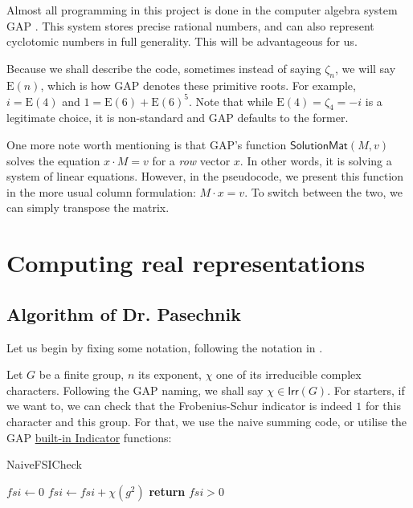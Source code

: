 \documentclass[11pt]{article}
\begin{document}
Almost all programming in this project is done in the computer algebra system GAP
\cite{GAP4}. This system stores precise rational numbers, and can also represent
cyclotomic numbers in full generality. This will be advantageous for us.

Because we shall describe the code, sometimes instead of saying $\zeta_n$, we
will say $\text{E}(n)$, which is how GAP denotes these primitive roots. For
example, $i = \text{E}(4)$ and $1 = \text{E}(6) + \text{E}(6)^5$. Note that while
$\text{E}(4) = \zeta_4 = -i$ is a legitimate choice, it is non-standard and GAP defaults
to the former.

One more note worth mentioning is that GAP's function $\textsf{SolutionMat}(M, v)$
solves the equation $x \cdot M = v$ for a \textit{row} vector $x$. In other words,
it is solving a system of linear equations. However, in the pseudocode, we present
this function in the more usual column formulation: $M \cdot x = v$. To switch
between the two, we can simply transpose the matrix.

\newpage

\section{Computing real representations}

\subsection{Algorithm of Dr. Pasechnik} \label{sec:alg}

Let us begin by fixing some notation, following the notation in \cite{Pas21}.

Let $G$ be a finite group, $n$ its exponent, $\chi$ one of its irreducible complex characters. 
Following the GAP naming, we shall say $\chi \in \textsf{Irr}(G)$. For starters, if we want to,
we can check that the Frobenius-Schur indicator is indeed $1$ for this character and this group.
For that, we use the naive summing code, or utilise the GAP
\href{https://docs.gap-system.org/doc/ref/chap71_mj.html#X7FD3D3047DE6381E}{built-in Indicator} functions:

\begin{algorithm}
  \caption{NaiveFSICheck}
  \begin{algorithmic}
    \State $fsi \gets 0$
      \State $fsi \gets fsi + \chi(g^2)$
    \EndFor
    \State \textbf{return} $fsi > 0$
  \end{algorithmic}
\end{algorithm}
\end{document}

